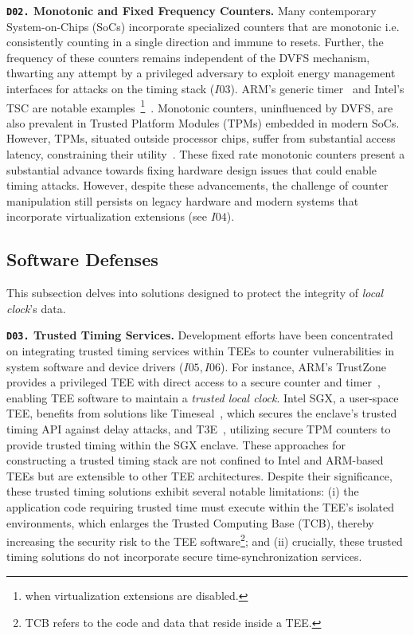 \noindent\textbf{\texttt{D02.} Monotonic and Fixed Frequency Counters.} Many contemporary System-on-Chips (SoCs) incorporate specialized counters that are monotonic i.e. consistently counting in a single direction and immune to resets. Further, the frequency of these counters remains independent of the DVFS mechanism, thwarting any attempt by a privileged adversary to exploit energy management interfaces for attacks on the timing stack ($I03$). ARM's generic timer~\cite{arm-generic-timer} and Intel's TSC are notable examples~\footnote{when virtualization extensions are disabled.}~\cite{intel-tsc}. Monotonic counters, uninfluenced by DVFS, are also prevalent in Trusted Platform Modules (TPMs) embedded in modern SoCs\cite{ftpm}. However, TPMs, situated outside processor chips, suffer from substantial access latency, constraining their utility~\cite{time-stack-timeseal}. These fixed rate monotonic counters present a substantial advance towards fixing hardware design issues that could enable timing attacks. However, despite these advancements, the challenge of counter manipulation still persists on legacy hardware and modern systems that incorporate virtualization extensions (see $I04$). 

\subsection{Software Defenses}
This subsection delves into solutions designed to protect the integrity of \textit{local clock}'s data. 

\noindent\textbf{\texttt{D03.} Trusted Timing Services.} Development efforts have been concentrated on integrating trusted timing services within TEEs to counter vulnerabilities in system software and device drivers ($I05, I06$). For instance, ARM's TrustZone provides a privileged TEE with direct access to a secure counter and timer~\cite{arm-generic-timer}, enabling TEE software to maintain a \textit{trusted local clock}. Intel SGX, a user-space TEE, benefits from solutions like Timeseal~\cite{time-stack-timeseal}, which secures the enclave's trusted timing API against delay attacks, and T3E~\cite{trusted-time-t3e}, utilizing secure TPM counters to provide trusted timing within the SGX enclave. These approaches for constructing a trusted timing stack are not confined to Intel and ARM-based TEEs but are extensible to other TEE architectures. Despite their significance, these trusted timing solutions exhibit several notable limitations: (i) the application code requiring trusted time must execute within the TEE's isolated environments, which enlarges the Trusted Computing Base (TCB), thereby increasing the security risk to the TEE software\footnote{TCB refers to the code and data that reside inside a TEE.}; and (ii) crucially, these trusted timing solutions do not incorporate secure time-synchronization services.

